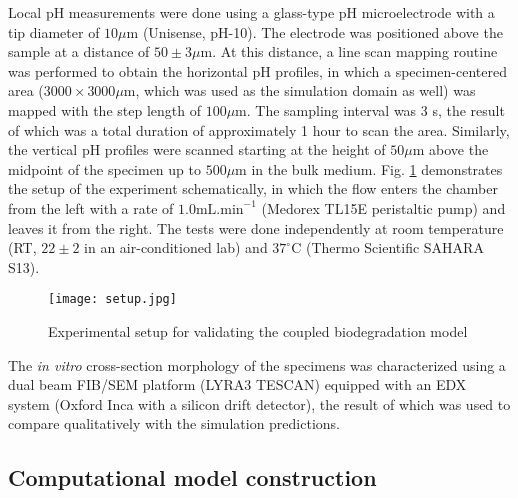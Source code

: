 
Local pH measurements were done using a glass-type pH microelectrode with a tip diameter of $10\mu\text{m}$ (Unisense, pH-10). The electrode was positioned above the sample at a distance of $50\pm3\mu\text{m}$. At this distance, a line scan mapping routine was performed to obtain the horizontal pH profiles, in which a specimen-centered area ($3000 \times 3000 \mu\text{m}$, which was used as the simulation domain as well) was mapped with the step length of $100\mu\text{m}$. The sampling interval was 3 s, the result of which was a total duration of approximately 1 hour to scan the area. Similarly, the vertical pH profiles were scanned starting at the height of $50\mu\text{m}$ above the midpoint of the specimen up to $500\mu\text{m}$ in the bulk medium. Fig. \ref{fig:kinetics_setup} demonstrates the setup of the experiment schematically, in which the flow enters the chamber from the left with a rate of $1.0\text{mL.min}^{-1}$ (Medorex TL15E peristaltic pump) and leaves it from the right. The tests were done independently at room temperature (\gls{RT}, $22 \pm 2$ in an air-conditioned lab) and $37^{\circ}\text{C}$ (Thermo Scientific SAHARA S13).


\begin{figure}[h]
\centering
\medskip
\texttt{[image: setup.jpg]}
\caption[Experimental setup for validating the coupled biodegradation model]{Experimental setup for validating the coupled biodegradation model} \label{fig:kinetics_setup}
\end{figure}


The \textit{in vitro} cross-section morphology of the specimens was characterized using a dual beam \gls{FIB}/\gls{SEM} platform (LYRA3 TESCAN) equipped with an \gls{EDX} system (Oxford Inca with a silicon drift detector), the result of which was used to compare qualitatively with the simulation predictions.

\subsection{Computational model construction}

